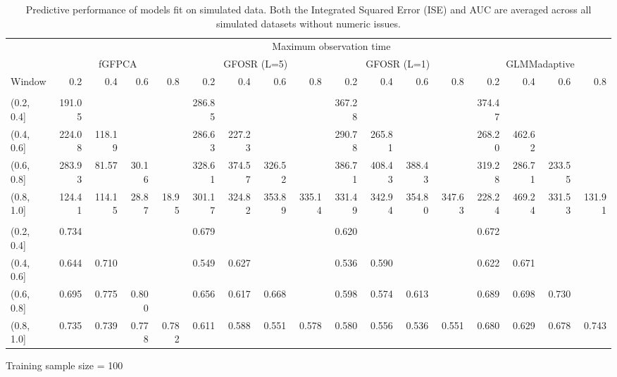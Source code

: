 \documentclass[12pt]{article}
\begin{document}
\begin{landscape}
\begin{table}
\hfill

\begin{subtable}{\textwidth}
\small
\centering
\begin{tabular}{lrrrrrrrrrrrrrrrr}
\toprule
\multicolumn{1}{c}{ } & \multicolumn{16}{c}{Maximum observation time} \\
\cmidrule(l{3pt}r{3pt}){2-17}
\multicolumn{1}{c}{ } & \multicolumn{4}{c}{fGFPCA} & \multicolumn{4}{c}{GFOSR (L=5)} & \multicolumn{4}{c}{GFOSR (L=1)} & \multicolumn{4}{c}{GLMMadaptive} \\
\cmidrule(l{3pt}r{3pt}){2-5} \cmidrule(l{3pt}r{3pt}){6-9} \cmidrule(l{3pt}r{3pt}){10-13} \cmidrule(l{3pt}r{3pt}){14-17}
Window & 0.2 & 0.4 & 0.6 & 0.8 & 0.2 & 0.4 & 0.6 & 0.8 & 0.2 & 0.4 & 0.6 & 0.8 & 0.2 & 0.4 & 0.6 & 0.8\\
\midrule
\addlinespace[0.3em]
\multicolumn{17}{l}{\textbf{ISE}}\\
\hspace{1em}(0.2, 0.4] & 191.05 &  &  &  & 286.85 &  &  &  & 367.28 &  &  &  & 374.47 &  &  & \\
\hspace{1em}(0.4, 0.6] & 224.08 & 118.19 &  &  & 286.63 & 227.23 &  &  & 290.78 & 265.81 &  &  & 268.20 & 462.62 &  & \\
\hspace{1em}(0.6, 0.8] & 283.93 & 81.57 & 30.16 &  & 328.61 & 374.57 & 326.52 &  & 386.71 & 408.43 & 388.43 &  & 319.28 & 286.71 & 233.55 & \\
\hspace{1em}(0.8, 1.0] & 124.41 & 114.15 & 28.87 & 18.95 & 301.17 & 324.82 & 353.89 & 335.14 & 331.49 & 342.94 & 354.80 & 347.63 & 228.24 & 469.24 & 331.53 & 131.91\\
\addlinespace[0.3em]
\multicolumn{17}{l}{\textbf{AUC}}\\
\hspace{1em}(0.2, 0.4] & 0.734 &  &  &  & 0.679 &  &  &  & 0.620 &  &  &  & 0.672 &  &  & \\
\hspace{1em}(0.4, 0.6] & 0.644 & 0.710 &  &  & 0.549 & 0.627 &  &  & 0.536 & 0.590 &  &  & 0.622 & 0.671 &  & \\
\hspace{1em}(0.6, 0.8] & 0.695 & 0.775 & 0.800 &  & 0.656 & 0.617 & 0.668 &  & 0.598 & 0.574 & 0.613 &  & 0.689 & 0.698 & 0.730 & \\
\hspace{1em}(0.8, 1.0] & 0.735 & 0.739 & 0.778 & 0.782 & 0.611 & 0.588 & 0.551 & 0.578 & 0.580 & 0.556 & 0.536 & 0.551 & 0.680 & 0.629 & 0.678 & 0.743\\
\bottomrule
\end{tabular}

\caption{Training sample size = 100}
\label{tab:sim_small}
\end{subtable}

\caption{Predictive performance of models fit on simulated data. Both the Integrated Squared Error (ISE) and AUC are averaged across all simulated datasets without numeric issues.}
\label{tab:sim}
\end{table}
\end{landscape}
\end{document}
